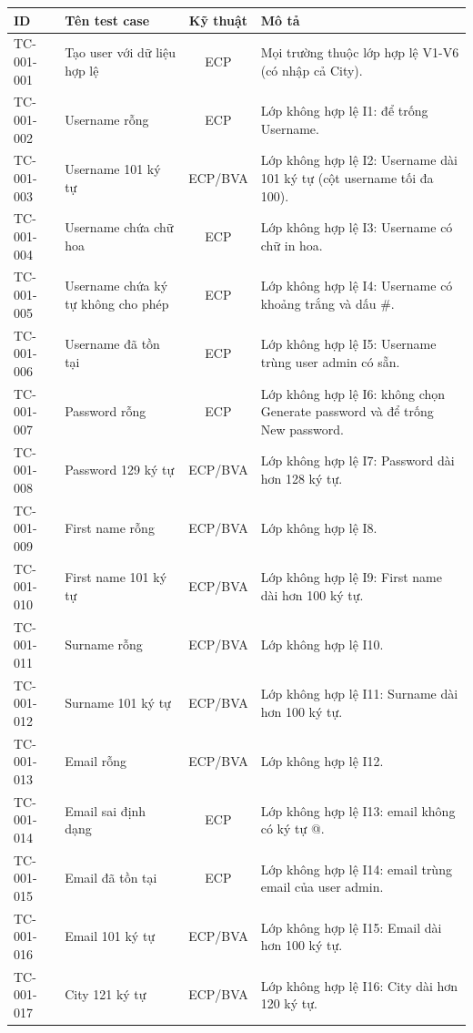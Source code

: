 {\footnotesize
\begin{longtable}{|l|L{4.4cm}|c|L{6.4cm}|}
\hline
{}\textbf{ID} & \textbf{Tên test case} & \textbf{Kỹ thuật} & \textbf{Mô tả} \\ \hline
\endhead
TC-001-001 & Tạo user với dữ liệu hợp lệ & ECP & Mọi trường thuộc lớp hợp lệ V1-V6 (có nhập cả City). \\ \hline
TC-001-002 & Username rỗng & ECP & Lớp không hợp lệ I1: để trống Username. \\ \hline
TC-001-003 & Username 101 ký tự & ECP/BVA & Lớp không hợp lệ I2: Username dài 101 ký tự (cột username tối đa 100). \\ \hline
TC-001-004 & Username chứa chữ hoa & ECP & Lớp không hợp lệ I3: Username có chữ in hoa. \\ \hline
TC-001-005 & Username chứa ký tự không cho phép & ECP & Lớp không hợp lệ I4: Username có khoảng trắng và dấu \#. \\ \hline
TC-001-006 & Username đã tồn tại & ECP & Lớp không hợp lệ I5: Username trùng user admin có sẵn. \\ \hline
TC-001-007 & Password rỗng & ECP & Lớp không hợp lệ I6: không chọn Generate password và để trống New password. \\ \hline
TC-001-008 & Password 129 ký tự & ECP/BVA & Lớp không hợp lệ I7: Password dài hơn 128 ký tự. \\ \hline
TC-001-009 & First name rỗng & ECP/BVA & Lớp không hợp lệ I8. \\ \hline
TC-001-010 & First name 101 ký tự & ECP/BVA & Lớp không hợp lệ I9: First name dài hơn 100 ký tự. \\ \hline
TC-001-011 & Surname rỗng & ECP/BVA & Lớp không hợp lệ I10. \\ \hline
TC-001-012 & Surname 101 ký tự & ECP/BVA & Lớp không hợp lệ I11: Surname dài hơn 100 ký tự. \\ \hline
TC-001-013 & Email rỗng & ECP/BVA & Lớp không hợp lệ I12. \\ \hline
TC-001-014 & Email sai định dạng & ECP & Lớp không hợp lệ I13: email không có ký tự @. \\ \hline
TC-001-015 & Email đã tồn tại & ECP & Lớp không hợp lệ I14: email trùng email của user admin. \\ \hline
TC-001-016 & Email 101 ký tự & ECP/BVA & Lớp không hợp lệ I15: Email dài hơn 100 ký tự. \\ \hline
TC-001-017 & City 121 ký tự & ECP/BVA & Lớp không hợp lệ I16: City dài hơn 120 ký tự. \\ \hline

\end{longtable}}
